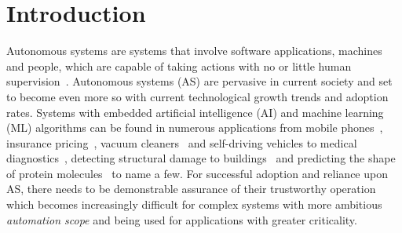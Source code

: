 % 


\section{Introduction}\label{sec:intro}

Autonomous systems are systems that involve software applications, machines and people, which are capable of taking actions with no or little human supervision~\cite{Murukannaiah2020}.
%
Autonomous systems (AS) are pervasive in current society and set to become even more so with current technological growth trends and adoption rates. Systems with embedded artificial intelligence (AI) and machine learning (ML) algorithms can be found in numerous applications from mobile phones~\cite{mediumaiphones}, insurance pricing~\cite{kuo2020towards}, vacuum cleaners~\cite{tf_vacuum} and self-driving vehicles to medical diagnostics~\cite{kononenko2001machine}, detecting structural damage to buildings~\cite{avci2021review} and predicting the shape of protein molecules~\cite{alpha_fold} to name a few.
%
For successful adoption and reliance upon AS, there needs to be demonstrable assurance of their trustworthy operation which becomes increasingly difficult for complex systems with more ambitious \emph{automation scope} and being used for applications with greater criticality. 
%

